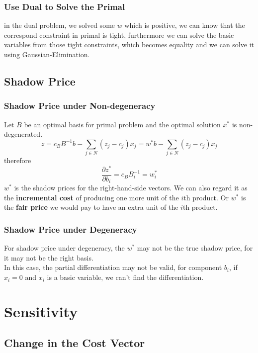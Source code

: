				\subsubsection{Use Dual to Solve the Primal}
					in the dual problem, we solved some $w$ which is positive, we can know that the correspond constraint in primal is tight, furthermore we can solve the basic variables from those tight constraints, which becomes equality and we can solve it using Gaussian-Elimination.

			\subsection{Shadow Price}
				\subsubsection{Shadow Price under Non-degeneracy}
					Let $B$ be an optimal basis for primal problem and the optimal solution $x^*$ is non-degenerated.
					\begin{equation}
						z=c_BB^{-1}b - \sum_{j\in N}(z_j - c_j)x_j = w^*b - \sum_{j\in N}(z_j - c_j)x_j 
					\end{equation}
					therefore
					\begin{equation}
						\frac{\partial z^*}{\partial b_i} = c_BB^{-1}_i = w_i^* 
					\end{equation}
					$w^*$ is the shadow prices for the right-hand-side vectors. We can also regard it as the \textbf{incremental cost} of producing one more unit of the $i$th product. Or $w^*$ is the \textbf{fair price} we would pay to have an extra unit of the $i$th product.

				\subsubsection{Shadow Price under Degeneracy}
					For shadow price under degeneracy, the $w^*$ may not be the true shadow price, for it may not be the right basis.\\
					In this case, the partial differentiation may not be valid, for component $b_i$, if $x_i = 0$ and $x_i$ is a basic variable, we can't find the differentiation.

		\section{Sensitivity}
			\subsection{Change in the Cost Vector}
